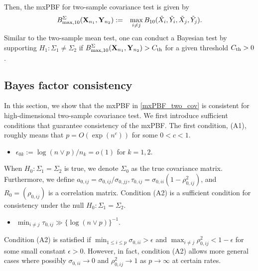 \documentclass[11pt]{article}
\newcommand{\bean}{\begin{eqnarray}}
\newcommand{\eean}{\end{eqnarray}}
\newcommand{\bfX}{{\bf X}}
\newcommand{\bfY}{{\bf Y}}
\newcommand{\sg}{\Sigma}
\begin{document}
Then, the mxPBF for two-sample covariance test is given by
\bean\label{mxPBF_two_cov}
B_{\max,10}^{\sg}(\bfX_{n_1}, \bfY_{n_2}) &:=& \max_{i\neq j} B_{10}(\tilde{X}_i, \tilde{Y}_i, \tilde{X}_j,\tilde{Y}_j).
\eean
Similar to the two-sample mean test, one can conduct a Bayesian test by supporting $H_1:\sg_1\neq \sg_2$ if $B_{\max,10}^{\sg}(\bfX_{n_1}, \bfY_{n_2}) > C_{\rm th}$ for a given threshold $C_{\rm th}>0$.

\subsection{Bayes factor consistency}\label{subsec:mxPBF_consistency_cov}

In this section, we show that the mxPBF in \eqref{mxPBF_two_cov} is consistent for high-dimensional two-sample covariance test.
We first introduce sufficient conditions that guarantee consistency of the mxPBF.
The first condition, (A1), roughly means that $p = O (\exp(n^c))$ for some $0<c<1$.
\begin{itemize}
	\item[(A1)] $\epsilon_{0k} := \log(n\vee p)/n_k = o(1)$ for $k=1,2$.
\end{itemize}




When $H_0: \sg_1= \sg_2$ is true, we denote $\sg_0$ as the true covariance matrix. 
Furthermore, we define $a_{0,ij} = \sigma_{0,ij}/\sigma_{0,jj}, \tau_{0,ij}= \sigma_{0,ii}(1- \rho_{0,ij}^2)$, and $R_0=(\rho_{0,ij})$ is a correlation matrix.
Condition (A2) is a sufficient condition for consistency under the null $H_0: \sg_1= \sg_2$.
\begin{itemize}
	\item[(A2)] $\min_{i\neq j}\tau_{0,ij} \gg \{\log (n\vee p)\}^{-1}$.
\end{itemize}
Condition (A2) is satisfied if $\min_{1\le i\le p} \sigma_{0,ii} > \epsilon$ and $\max_{i\neq j} \rho_{0,ij}^2 < 1-\epsilon$ for some small constant $\epsilon>0$.
However, in fact, condition (A2) allows more general cases where possibly $\sigma_{0,ii} \to 0$ and $\rho_{0,ij}^2 \to 1$ as $p\to \infty$ at certain rates.
\end{document}
